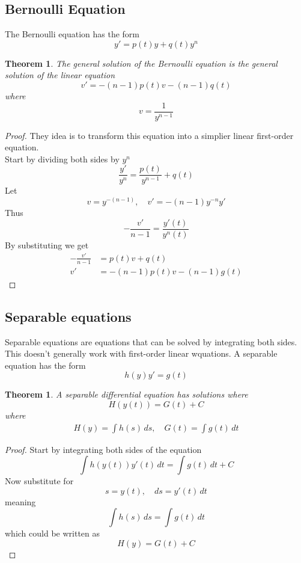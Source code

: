 \documentclass{article}
\newtheorem*{theorem5}{Theorem}
\newtheorem*{theorem6}{Theorem}
\begin{document}
\pagebreak

\subsection{Bernoulli Equation}

The Bernoulli equation has the form
\[
    y' = p(t)y + q(t)y^n
\]

\begin{theorem5}
    The general solution of the Bernoulli equation is the general
    solution of the linear equation
    \[
        v' = -(n-1)p(t)v-(n-1)q(t)
    \]
    where
    \[
        v = \frac{1}{y^{n-1}}
    \]
\end{theorem5}
\begin{proof}
    They idea is to transform this equation into a simplier
    linear first-order equation. \\
    Start by dividing both sides by \(y^n\)
    \[
        \frac{y'}{y^n} = \frac{p(t)}{y^{n-1}} + q(t)
    \]
    Let
    \[
        v = y^{-(n-1)}, 
        \quad
        v' = -(n-1)y^{-n}y'
    \]
    Thus
    \[
        -\frac{v'}{n-1} = \frac{y'(t)}{y^n(t)}
    \]
    By substituting we get
    \begin{align*}
        -\frac{v'}{n-1} &= p(t)v + q(t) \\
        v' &= -(n-1)p(t)v-(n-1)g(t)
    \end{align*}
\end{proof}

\pagebreak

\subsection{Separable equations}

Separable equations are equations that can be solved by integrating both sides.
This doesn't generally work with first-order linear wquations.
A separable equation has the form
\[
    h(y)y'=g(t)
\]
\begin{theorem6}
    A separable differential equation has solutions where
    \[
        H(y(t)) = G(t) + C
    \]
    where
    \begin{align*}
        H(y) = \int h(s)\,ds
        ,\quad
        G(t) = \int g(t)\,dt
    \end{align*}
\end{theorem6}
\begin{proof}
    Start by integrating both sides of the equation
    \[
        \int h(y(t))y'(t)\,dt =
        \int g(t)\,dt + C
    \]
    Now substitute for
    \[
        s=y(t),
        \quad
        ds=y'(t)\,dt
    \]
    meaning
    \[
        \int h(s)\, ds = 
        \int g(t)\,dt
    \]
    which could be written as
    \[
        H(y) = G(t) + C
    \]
\end{proof}
\end{document}
